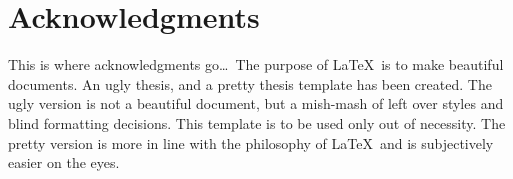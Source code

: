 \chapter*{Acknowledgments}

This is where acknowledgments go\ldots\ The purpose of \LaTeX\ is to make beautiful documents. An ugly thesis, and a pretty thesis  template has been created. The ugly version is not a beautiful document, but a mish-mash of left over styles and blind formatting decisions. This template is to be used only out of necessity. The pretty version is more in line with the philosophy of \LaTeX\ and is subjectively easier on the eyes. \blindtext
